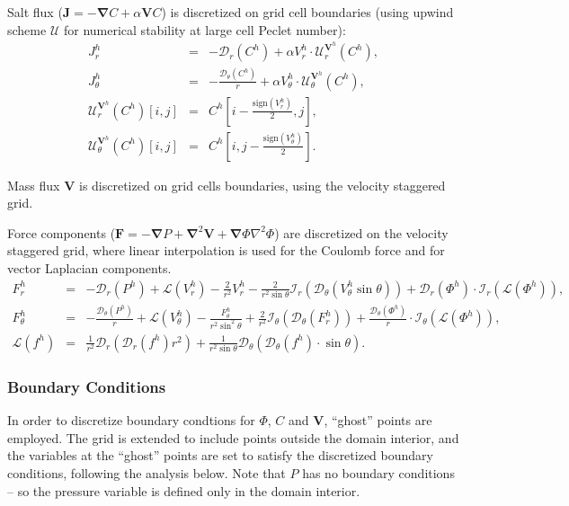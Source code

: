 \documentclass[final]{elsarticle}
\newcommand{\sign}{\ensuremath{\mathrm{sign}}}
\newcommand{\pars}[1]{\left(#1\right)}
\newcommand\Laplacian{\nabla^2}
\newcommand\bnabla{\boldsymbol{\nabla}}
\newcommand\bLaplacian{\boldsymbol{\nabla}^2}
\newcommand\bV{\boldsymbol{V}}
\newcommand\bF{\boldsymbol{F}}
\newcommand\bJ{\boldsymbol{J}}
\newcommand\cI{\mathcal{I}}
\newcommand\cD{\mathcal{D}}
\newcommand\cL{\mathcal{L}}
\begin{document}
Salt flux ($\bJ = -\bnabla C + \alpha \bV C$) is discretized on grid cell boundaries 
(using upwind scheme $\mathcal{U}$ for numerical stability at large cell Peclet number):
\begin{eqnarray*}
J^h_r &=& -\cD_r(C^h) + \alpha V^h_r \cdot \mathcal{U}^{\bV^h}_r (C^h), \\
J^h_\theta &=& -\frac{\cD_\theta(C^h)}{r} + \alpha V^h_\theta \cdot \mathcal{U}^{\bV^h}_\theta (C^h), \\
 \mathcal{U}^{\bV^h}_r(C^h)[i,j] &=& C^h\left[i-\frac{\sign(V^h_r)}{2}, j\right], \\
 \mathcal{U}^{\bV^h}_\theta(C^h)[i,j] &=& C^h\left[i, j-\frac{\sign(V^h_\theta)}{2}\right]. 
\end{eqnarray*}

Mass flux $\bV$ is discretized on grid cells boundaries, 
using the velocity staggered grid.

Force components ($\bF = -\bnabla P + \bLaplacian \bV + \bnabla \varPhi \Laplacian \varPhi$) 
are discretized on the velocity staggered grid, where
linear interpolation is used for the Coulomb force and for vector Laplacian components.
\begin{eqnarray*}
F^h_r &=& -\cD_r(P^h) 
          + \cL(V^h_r) - \frac{2}{r^2} V^h_r 
		  - \frac{2}{r^2 \sin\theta} \cI_r(\cD_\theta (V^h_\theta \sin\theta))
          + \cD_r(\varPhi^h) \cdot \cI_r(\cL(\varPhi^h)), \\
F^h_\theta &=& -\frac{\cD_\theta(P^h)}{r} 
		  + \cL(V^h_\theta) - \frac{F^h_\theta}{r^2 \sin^2\theta} 
		  + \frac{2}{r^2} \cI_\theta(\cD_\theta(F^h_r))
		  + \frac{\cD_\theta(\varPhi^h)}{r} \cdot \cI_\theta(\cL(\varPhi^h)), \\
\cL(f^h) &=& \frac{1}{r^2}\cD_r\pars{\cD_r(f^h) r^2} + 
\frac{1}{r^2 \sin\theta} \cD_\theta\pars{\cD_\theta(f^h) \cdot \sin\theta}.
\end{eqnarray*}


\subsubsection{Boundary Conditions}
In order to discretize boundary condtions for $\varPhi$, $C$ and $\bV$, 
``ghost'' points are employed. 
The grid is extended to include points outside the domain interior,
and the variables at the ``ghost'' points are set to satisfy 
the discretized boundary conditions, following the analysis below.
Note that $P$ has no boundary conditions -- so the pressure variable is defined 
only in the domain interior.
\end{document}

